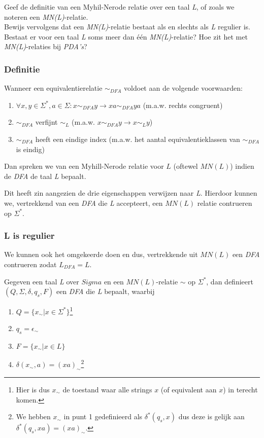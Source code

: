 
\begin{question}
  Geef de definitie van een Myhil-Nerode relatie over een taal \emph{L}, of zoals we noteren een \emph{MN(L)}-relatie. \\
  Bewijs vervolgens dat een \emph{MN(L)}-relatie bestaat als en slechts als \emph{L} regulier is. Bestaat er voor een taal \emph{L} soms meer dan één \emph{MN(L)}-relatie? Hoe zit het met \emph{MN(L)}-relaties bij \emph{PDA’s}?
\end{question}

\subsubsection*{Definitie}

\begin{theorem}
  Wanneer een equivalentierelatie $\sim_{DFA}$ voldoet aan de volgende voorwaarden:
  \begin{enumerate}
    \item $\forall x, y \in \Sigma^*, a \in \Sigma : x \sim_{DFA} y \rightarrow xa \sim_{DFA} ya$ (m.a.w. rechts congruent)
    \item $\sim_{DFA}$ verfijnt $\sim_L$ (m.a.w. $x \sim_{DFA} y \rightarrow x \sim_L y$)
    \item $\sim_{DFA}$ heeft een eindige index (m.a.w. het aantal equivalentieklassen van $\sim_{DFA}$ is eindig)
  \end{enumerate}
  Dan spreken we van een Myhill-Nerode relatie voor $L$ (oftewel $MN(L)$) indien de \emph{DFA} de taal \emph{L} bepaalt.
\end{theorem}

Dit heeft zin aangezien de drie eigenschappen verwijzen naar \emph{L}. Hierdoor kunnen we, vertrekkend van een \emph{DFA} die \emph{L} accepteert, een $MN(L)$ relatie contrueren op $\Sigma^*$.

\subsubsection*{L is regulier}

We kunnen ook het omgekeerde doen en dus, vertrekkende uit $MN(L)$ een \emph{DFA} contrueren zodat $L_{DFA} = L$.

\begin{theorem}
  Gegeven een taal \emph{L} over $Sigma$ en een $MN(L)$-relatie $\sim$ op $\Sigma^*$, dan definieert $(Q,\Sigma,\delta,q_s,F)$ een \emph{DFA} die \emph{L} bepaalt, waarbij
  \begin{enumerate}
    \item $Q = \{x_{\sim}|x \in \Sigma^*\}$\footnote{Hier is dus $x_{\sim}$ de toestand waar alle strings $x$ (of equivalent aan $x$) in terecht komen.}
    \item $q_s = \epsilon_{\sim}$
    \item $F = \{x_{\sim}|x \in L\}$
    \item $\delta(x_{\sim},a) = (xa)_{\sim}$\footnote{We hebben $x_{\sim}$ in punt 1 gedefinieerd als $\delta^*(q_s,x)$ dus deze is gelijk aan $\delta^*(q_s,xa) = (xa)_{\sim}$.}
  \end{enumerate}
\end{theorem}

